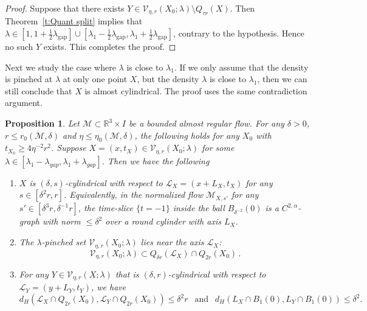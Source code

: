 \documentclass[11pt,reqno]{amsart}
\numberwithin{equation}{section}
\newcommand{\RR}{\mathds{R}}
\newcommand{\cL}{\mathcal{L}}
\newcommand{\cM}{\mathcal{M}}
\newcommand{\cV}{\mathcal{V}}
\newtheorem{proposition}[equation]{Proposition}
\theoremstyle{definition}
\theoremstyle{remark}
\theoremstyle{remark}
\theoremstyle{remark}
\theoremstyle{remark}\newtheorem{conjecture}[equation]{Conjecture}
\theoremstyle{remark}\newtheorem{question}[equation]{Question}
\begin{document}
\begin{proof}
Suppose that there exists $ Y\in \cV_{\eta,r}(X_0;\lambda) \setminus Q_{\tau r}(X)$. Then Theorem~\ref{t:Quant split} implies that $\lambda \in [1,1+\frac{1}{2}\lambda_{\mathrm{gap}}]\cup[\lambda_1-\frac{1}{2}\lambda_{\mathrm{gap}},\lambda_1+ \frac{1}{2}\lambda_{\mathrm{gap}}]$, contrary to the hypothesis. Hence no such $Y$ exists. This completes the proof.
\end{proof}




Next we study the case where $\lambda$ is close to $\lambda_1$. If we only assume that the density is pinched at $\lambda$ at only one point $X$, but the density $\lambda$ is close to $\lambda_1$, then we can still conclude that $X$ is almost cylindrical. The proof uses the same contradiction argument. 


\begin{proposition}\label{p:almost cylindrical rigidity}
    Let $\cM \subset \RR^3 \times I$ be a bounded almost regular flow. For any $\delta>0$, $r\le r_0(\cM,\delta)$ and $\eta\le \eta_0(\cM,\delta)$, the following holds for any $X_0$ with $t_{X_0} \ge 4\eta^{-2}r^2$. Suppose $ X = (x,t_X)\in \cV_{\eta,r}(X_0;\lambda)$ for some $\lambda \in [\lambda_1-\lambda_{gap},\lambda_1 +  \lambda_{gap}]$. Then we have the following
    \begin{enumerate}
        \item $X$ is $(\delta,s)$-cylindrical with respect to $\cL_{X} =(x+L_X,t_X)$ for any $s\in [\delta^2 r,r]$. Equivalently, in the normalized flow $\cM_{X,s'}$ for any $s'\in[\delta^3 r, \delta^{-1}r]$, the time-slice $\{t=-1\}$ inside the ball $B_{\delta^{-2}}(0)$ is a $C^{2,\alpha}$-graph with norm $\le\delta^2$ over a round cylinder with axis $L_X$.
        \item The $\lambda$-pinched set $\cV_{\eta,r}(X_0;\lambda)$ lies near the axis $\cL_{X}$:
        \begin{equation*}
            \cV_{\eta,r}(X_0;\lambda)\subset Q_{\delta r}(\cL_X)\cap Q_{2r}(X_0)\,.
        \end{equation*}
        \item For any $Y \in \cV_{\eta,r}(X;\lambda)$ that is $(\delta,r)$-cylindrical with respect to $\cL_Y=(y+L_Y,t_Y)$, we have
        \begin{equation*}
            d_H(\cL_X \cap Q_{2r}(X_0) , \cL_Y \cap Q_{2r}(X_0)) \le \delta^2 r ~~ \text{ and } ~~ d_H(L_X\cap B_1(0), L_Y \cap B_1(0)) \le \delta^2.
        \end{equation*}
    \end{enumerate}
\end{proposition}
\end{document}
